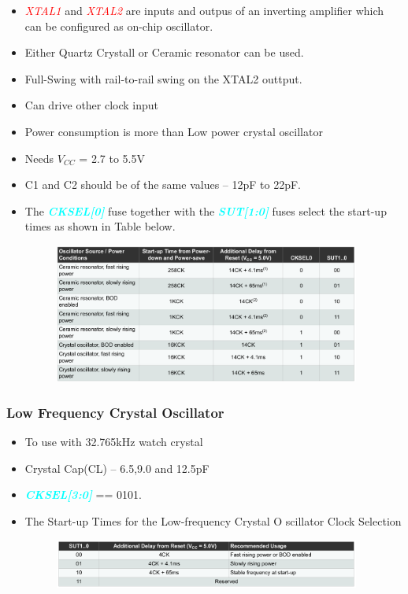 \documentclass{article}
\newcommand{\bitFormat}[1]{\emph{\textbf{\textcolor{cyan}{#1}}}}
\newcommand{\pinFormat}[1]{\emph{\textcolor{red}{#1}}}
\begin{document}
\begin{itemize}
    \item \pinFormat{XTAL1} and \pinFormat{XTAL2} are inputs and outpus of an inverting amplifier which can be configured as on-chip oscillator.
    \item Either Quartz Crystall or Ceramic resonator can be used.
    \item Full-Swing with rail-to-rail swing on the XTAL2 outtput.
    \item Can drive other clock input
    \item Power consumption is more than Low power crystal oscillator
    \item Needs $V_{CC}$ = 2.7 to 5.5V
    \item C1 and C2 should be of the same values – 12pF to 22pF.
    \item  The \bitFormat{CKSEL[0]} fuse together with the \bitFormat{SUT[1:0]} fuses select the start-up times as shown in Table below.
    \begin{figure}[H]
        \begin{center}
            \includegraphics[width=0.95\textwidth]{startUpTimesLowPowerCrystallOscillator.png}
        \end{center}
    \end{figure}
\end{itemize}

\subsubsection{Low Frequency Crystal Oscillator}
\begin{itemize}
    \item To use with 32.765kHz watch crystal
    \item Crystal Cap(CL) – 6.5,9.0 and 12.5pF
    \item \bitFormat{CKSEL[3:0]} == 0101.
    \item The Start-up Times for the Low-frequency Crystal O scillator Clock Selection
    \begin{figure}[H]
        \begin{center}
            \includegraphics[width=0.95\textwidth]{startUpTimelowFrequencyCrysalOscillator.png}
        \end{center}
    \end{figure}
\end{itemize}
\end{document}

